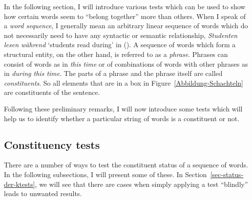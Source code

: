 \noindent
In the following section, I will introduce various tests which can be used to show how certain
words seem to ``belong together'' more than others. When I speak of a \emph{word sequence}, I generally mean
an arbitrary linear sequence of words which do not necessarily need to have any syntactic or semantic relationship, \eg
\emph{Studenten lesen während} `students read during' in (). A sequence of words which form a
structural entity, on the other hand,  is referred to as a \emph{phrase}. Phrases can
consist of words as in \emph{this time} or of combinations of words with other phrases as in
\emph{during this time}. The parts of a phrase and the phrase itself are called
\emph{constituents}. So all elements that are in a box in
Figure~\ref{Abbildung-Schachteln} are constituents of the sentence. 


Following these preliminary remarks, I will now introduce some tests which will help us to identify whether a particular
string of words is a constituent or not.


\subsection{Constituency tests}

There are a number of ways to test the constituent status of a sequence of words. In the following subsections, I will present some of these. In 
Section~\ref{sec-status-der-ktests}, we will see that there are cases when simply applying a test ``blindly'' leads to unwanted results.

